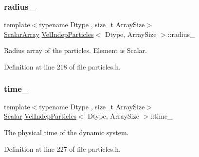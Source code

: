 \mbox{\label{class_vel_indep_particles_adf3e6c9acf2f864523a5efb634275093}} 
\subsubsection{\texorpdfstring{radius\+\_\+}{radius\_}}
{\footnotesize\ttfamily template$<$typename Dtype , size\+\_\+t Array\+Size$>$ \\
\mbox{\hyperlink{class_vel_indep_particles_abd6e6b0ffbbab4ebc078efd77f6a365a}{Scalar\+Array}} \mbox{\hyperlink{class_vel_indep_particles}{Vel\+Indep\+Particles}}$<$ Dtype, Array\+Size $>$\+::radius\+\_\+\hspace{0.3cm}{\ttfamily [protected]}}



Radius array of the particles. Element is Scalar. 



Definition at line 218 of file particles.\+h.

\mbox{\label{class_vel_indep_particles_a8140d67141a80312c882b8fd5368e75a}} 
\subsubsection{\texorpdfstring{time\+\_\+}{time\_}}
{\footnotesize\ttfamily template$<$typename Dtype , size\+\_\+t Array\+Size$>$ \\
\mbox{\hyperlink{class_vel_indep_particles_a5d275b22f0d759f360ddd80e78f4b466}{Scalar}} \mbox{\hyperlink{class_vel_indep_particles}{Vel\+Indep\+Particles}}$<$ Dtype, Array\+Size $>$\+::time\+\_\+\hspace{0.3cm}{\ttfamily [protected]}}



The physical time of the dynamic system. 



Definition at line 227 of file particles.\+h.

\mbox{\label{class_vel_indep_particles_ac1bc885b0b3434f604776880cb551a17}} 
